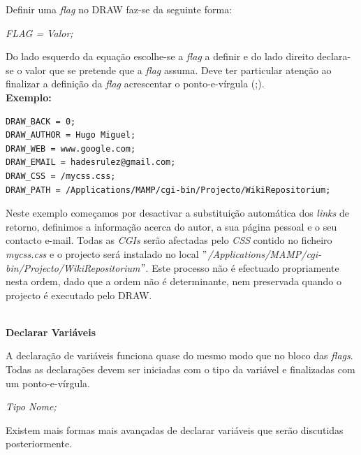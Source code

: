 \documentclass[a4paper]{article}
\begin{document}
Definir uma \emph{flag} no DRAW faz-se da seguinte forma:

\begin{center}
\emph{FLAG = Valor;}
\end{center}

\hspace{1cm}Do lado esquerdo da equação escolhe-se a \emph{flag} a definir e do lado direito declara-se o valor que se pretende que a
\emph{flag} assuma. Deve ter particular atenção ao finalizar a definição da \emph{flag} acrescentar o ponto-e-vírgula (;).\\

\textbf{Exemplo:}

\begin{small}
\begin{lstlisting}
DRAW_BACK = 0;
DRAW_AUTHOR = Hugo Miguel;
DRAW_WEB = www.google.com;
DRAW_EMAIL = hadesrulez@gmail.com;
DRAW_CSS = /mycss.css;
DRAW_PATH = /Applications/MAMP/cgi-bin/Projecto/WikiRepositorium;
\end{lstlisting}
\end{small}

\vspace{.2cm}
\hspace{1cm}Neste exemplo começamos por desactivar a substituição automática dos \emph{links} de retorno, definimos a informação acerca
do autor, a sua página pessoal e o seu contacto e-mail. Todas as \emph{CGIs} serão afectadas pelo \emph{CSS} contido no ficheiro
\emph{mycss.css} e o projecto será instalado no local \emph{$"$/Applications/MAMP/cgi-bin/Projecto/WikiRepositorium$"$}.
Este processo não é efectuado propriamente nesta ordem, dado que a ordem não é determinante, nem preservada quando o projecto é executado
pelo DRAW.\\\\

\begin{large}
\textbf{Declarar Variáveis}\\
\end{large}

\hspace{1cm}A declaração de variáveis funciona quase do mesmo modo que no bloco das \emph{flags}. Todas as declarações devem ser
iniciadas com o tipo da variável e finalizadas com um ponto-e-vírgula.

\begin{center}
\emph{Tipo Nome;}
\end{center}

Existem mais formas mais avançadas de declarar variáveis que serão discutidas posteriormente.\\
\end{document}
